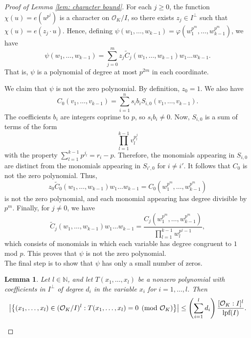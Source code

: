 \documentclass{amsart}
\newtheorem{lemma}[theorem]{Lemma}
\theoremstyle{definition}
\numberwithin{equation}{section}
\newcommand{\N}{\mathbb{N}}
\newcommand{\mO}{\mathcal{O}}
\newcommand{\lpf}{\normalfont\text{lpf}}
\renewcommand{\tilde}{\widetilde}
\begin{document}
\begin{proof}[Proof of Lemma \ref{lem: character bound}]
	For each $j \ge 0$, the function $\chi(u) = e(u^{p^j})$ is a character on $\mO_K/I$, so there exists $z_j \in I^{\perp}$ such that $\chi(u) = e(z_j \cdot u)$.
	Hence, defining $\psi(w_1, \dots, w_{k-1}) = \varphi \left( w_1^{p^m}, \dots, w_{k-1}^{p^m} \right)$, we have
	\begin{equation*}
		\psi(w_1, \dots, w_{k-1}) = \sum_{j=0}^m{z_j \tilde{C}_j(w_1, \dots, w_{k-1}) w_1 \dots w_{k-1}}.
	\end{equation*}
	That is, $\psi$ is a polynomial of degree at most $p^{2m}$ in each coordinate.
	
	We claim that $\psi$ is not the zero polynomial.
	By definition, $z_0 = 1$.
	We also have
	\begin{equation*}
		C_0(v_1, \dots, v_{k-1}) = \sum_{i=1}^n{s_i b_i S_{i,0}(v_1, \dots, v_{k-1})}.
	\end{equation*}
	The coefficients $b_i$ are integers coprime to $p$, so $s_ib_i \ne 0$.
	Now, $S_{i,0}$ is a sum of terms of the form
	\begin{equation*}
		\prod_{l=1}^{k-1}{v_l^{p^j_l}}
	\end{equation*}
	with the property $\sum_{l=1}^{k-1}{p^{j_l}} = r_i - p$.
	Therefore, the monomials appearing in $S_{i,0}$ are distinct from the monomials appearing in $S_{i',0}$ for $i \ne i'$.
	It follows that $C_0$ is not the zero polynomial.
	Thus,
	\begin{equation*}
		z_0 \tilde{C}_0(w_1, \dots, w_{k-1})w_1 \dots w_{k-1} = C_0 \left( w_1^{p^m}, \dots, w_{k-1}^{p^m} \right)
	\end{equation*}
	is not the zero polynomial, and each monomial appearing has degree divisible by $p^m$.
	Finally, for $j \ne 0$, we have
	\begin{equation*}
		\tilde{C}_j(w_1, \dots, w_{k-1})w_1 \dots w_{k-1}
		 = \frac{C_j \left( w_1^{p^m}, \dots, w_{k-1}^{p^m} \right)}{\prod_{l=1}^{k-1}{w_l^{p^j-1}}},
	\end{equation*}
	which consists of monomials in which each variable has degree congruent to $1$ mod $p$.
	This proves that $\psi$ is not the zero polynomial. \\
	
	The final step is to show that $\psi$ has only a small number of zeros.
	
	\begin{lemma} \label{lem: nonzero polynomial}
		Let $l \in \N$, and let $T(x_1, \dots, x_l)$ be a nonzero polynomial with coefficients in $I^{\perp}$ of degree $d_i$ in the variable $x_i$ for $i = 1, \dots, l$.
		Then
		\begin{equation*}
			\left| \left\{ (x_1, \dots, x_l) \in (\mO_K/I)^l : T(x_1, \dots, x_l) = 0 \pmod{\mO_K} \right\} \right| \le \left( \sum_{i=1}^l{d_i} \right) \frac{[\mO_K:I]^l}{\lpf(I)}.
		\end{equation*}
	\end{lemma}


\end{proof}
\end{document}
